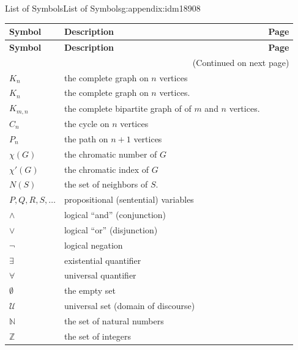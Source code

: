 \documentclass[oneside,10pt,]{book}
\numberwithin{equation}{chapter}
\def\N{\mathbb N}
\def\Z{\mathbb Z}
\def\U{\mathcal U}
\begin{document}
\begin{appendixptx}{List of Symbols}{}{List of Symbols}{}{}{g:appendix:idm18908}
\begin{longtable}[l]{lp{}r}
\addtocounter{table}{-1}
\textbf{Symbol}&\textbf{Description}&\textbf{Page}\\[1em]
\endfirsthead
\textbf{Symbol}&\textbf{Description}&\textbf{Page}\\[1em]
\endhead
\multicolumn{3}{r}{(Continued on next page)}\\
\endfoot
\endlastfoot
\(K_n\)&the complete graph on \(n\) vertices&\pageref{g:notation:idm9270}\\
\(K_n\)&the complete graph on \(n\) vertices.&\pageref{g:notation:idm9323}\\
\(K_{m,n}\)&the complete bipartite graph of of \(m\) and \(n\) vertices.&\pageref{g:notation:idm9333}\\
\(C_n\)&the cycle on \(n\) vertices&\pageref{g:notation:idm9343}\\
\(P_n\)&the path on \(n+1\) vertices&\pageref{g:notation:idm9353}\\
\(\chi(G)\)&the chromatic number of \(G\)&\pageref{g:notation:idm10830}\\
\(\chi'(G)\)&the chromatic index of \(G\)&\pageref{g:notation:idm11219}\\
\(N(S)\)&the set of neighbors of \(S\).&\pageref{g:notation:idm11466}\\
\(
                    P, Q, R, S, \ldots
                \)&propositional (sentential) variables&\pageref{g:notation:idm12305}\\
\(\wedge\)&logical ``and'' (conjunction)&\pageref{g:notation:idm12328}\\
\(\vee\)&logical ``or'' (disjunction)&\pageref{g:notation:idm12343}\\
\(\neg\)&logical negation&\pageref{g:notation:idm12388}\\
\(\exists\)&existential quantifier&\pageref{g:notation:idm12858}\\
\(\forall\)&universal quantifier&\pageref{g:notation:idm12871}\\
\(\emptyset\)&the empty set&\pageref{g:notation:idm13310}\\
\(\U\)&universal set (domain of discourse)&\pageref{g:notation:idm13320}\\
\(\N\)&the set of natural numbers&\pageref{g:notation:idm13328}\\
\(\Z\)&the set of integers&\pageref{g:notation:idm13340}\\

\end{longtable}
\end{appendixptx}
\end{document}
